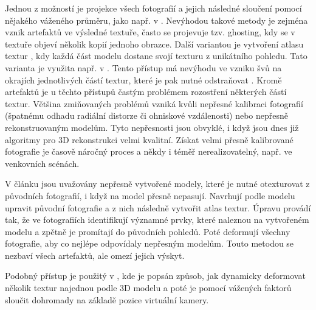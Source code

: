 \documentclass[11pt,twoside,a4paper]{book}
\begin{document}
Jednou z možností je projekce všech fotografií a jejich následné sloučení
pomocí nějakého váženého průměru, jako např. v \cite{Bernardini01}.
Nevýhodou takové metody je zejména vznik artefaktů ve výsledné textuře, často se
projevuje tzv. ghosting, kdy se v textuře objeví několik kopií jednoho obrazce.
Další variantou je vytvoření atlasu textur \cite{Allene08}, kdy každá část
modelu dostane svojí texturu z unikátního pohledu. Tato varianta je využita
např. v \cite{multi-view-tex}. Tento přístup má nevýhodu ve vzniku švů na
okrajích jednotlivých částí textur, které je pak nutné odstraňovat
\cite{seamless-mosaicing}. Kromě artefaktů je u těchto přístupů častým problémem
rozostření některých částí textur. Většina zmiňovaných problémů vzniká kvůli
nepřesné kalibraci fotografií (špatnému odhadu radiální distorze či ohniskové
vzdálenosti) nebo nepřesně rekonstruovaným modelům. Tyto nepřesnosti jsou
obvyklé, i když jsou dnes již algoritmy pro 3D rekonstrukci velmi kvalitní.
Získat velmi přesně kalibrované fotografie je časově náročný proces a někdy i
téměř nerealizovatelný, např. ve venkovních scénách.

V článku \cite{multi-view-tex} jsou uvažovány nepřesně vytvořené modely, které
je nutné otexturovat z původních fotografií, i když na model přesně nepasují.
Navrhují podle modelu upravit původní fotografie a z nich následně vytvořit
atlas textur. Úpravu provádí tak, že ve fotografiích identifikují významné
prvky, které naleznou na vytvořeném modelu a zpětně je promítají do původních
pohledů. Poté deformují všechny fotografie, aby co nejlépe odpovídaly nepřesným
modelům. Touto metodou se nezbaví všech artefaktů, ale omezí jejich výskyt.

Podobný přístup je použitý v \cite{harmonized-texture-mapping}, kde je
popsán způsob, jak dynamicky deformovat několik textur najednou podle 3D modelu
a poté je pomocí vážených faktorů sloučit dohromady na základě pozice virtuální
kamery.
\end{document}
